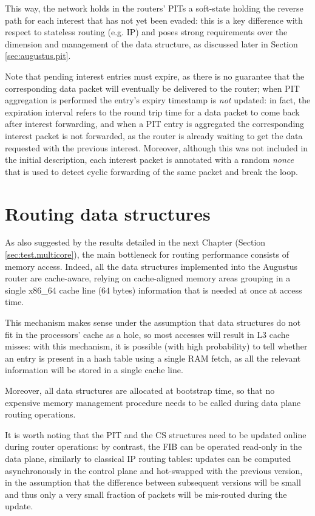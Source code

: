\documentclass[11pt,a4paper,twoside,titlepage,openany]{book}
\begin{document}
This way, the network holds in the routers' \gls{PIT}s a soft-state holding the reverse path for each interest that has not yet been evaded: this is a key difference with respect to stateless routing (e.g. IP) and poses strong requirements over the dimension and management of the data structure, as discussed later in Section \ref{sec:augustus.pit}.

Note that pending interest entries must expire, as there is no guarantee that the corresponding data packet will eventually be delivered to the router; when PIT aggregation is performed the entry's expiry timestamp is \emph{not} updated: in fact, the expiration interval refers to the round trip time for a data packet to come back after interest forwarding, and when a PIT entry is aggregated the corresponding interest packet is not forwarded, as the router is already waiting to get the data requested with the previous interest.  Moreover, although this was not included in the initial description, each interest packet is annotated with a random \emph{nonce} that is used to detect cyclic forwarding of the same packet and break the loop.


\section{Routing data structures}\label{sec:augustus.structures}
As also suggested by the results detailed in the next Chapter (Section \ref{sec:test.multicore}), the main bottleneck for routing performance consists of memory access. Indeed, all the data structures implemented into the Augustus router are cache-aware, relying on cache-aligned memory areas grouping in a single x86\_64 cache line ($64$ bytes) information that is needed at once at access time.

This mechanism makes sense under the assumption that data structures do not fit in the processors' cache as a hole, so most accesses will result in L3 cache misses: with this mechanism, it is possible (with high probability) to tell whether an entry is present in a hash table using a single RAM fetch, as all the relevant information will be stored in a single cache line.

Moreover, all data structures are allocated at bootstrap time, so that no expensive memory management procedure needs to be called during data plane routing operations.

It is worth noting that the \gls{PIT} and the \gls{CS} structures need to be updated online during router operations: by contrast, the \gls{FIB} can be operated read-only in the data plane, similarly to classical IP routing tables: updates can be computed asynchronously in the control plane and hot-swapped with the previous version, in the assumption that the difference between subsequent versions will be small and thus only a very small fraction of packets will be mis-routed during the update.
\end{document}
